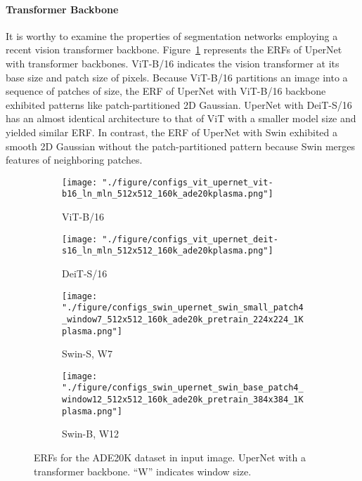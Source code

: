 \documentclass{article}
\def\figref#1{Figure~\ref{#1}}
\begin{document}
\paragraph{Transformer Backbone} It is worthy to examine the properties of segmentation networks employing a recent vision transformer backbone. \figref{fig:trback} represents the ERFs of UperNet \citep{DBLP:conf/eccv/XiaoLZJS18} with transformer backbones. ViT-B/16 indicates the vision transformer at its base size and patch size of  pixels. Because ViT-B/16 \citep{DBLP:conf/iclr/DosovitskiyB0WZ21} partitions an image into a sequence of patches of  size, the ERF of UperNet with ViT-B/16 backbone exhibited patterns like patch-partitioned 2D Gaussian. UperNet with DeiT-S/16 \citep{DBLP:conf/icml/TouvronCDMSJ21} has an almost identical architecture to that of ViT with a smaller model size and yielded similar ERF. In contrast, the ERF of UperNet with Swin \citep{DBLP:conf/iccv/LiuL00W0LG21} exhibited a smooth 2D Gaussian without the patch-partitioned pattern because Swin merges features of neighboring patches.

\begin{figure}[t!]
	\centering
	\begin{subfigure}[b]{0.241\linewidth}
		\centering
		\texttt{[image: "./figure/configs\_vit\_upernet\_vit-b16\_ln\_mln\_512x512\_160k\_ade20kplasma.png"]}
		\caption{ViT-B/16 \citep{DBLP:conf/iclr/DosovitskiyB0WZ21}}
	\end{subfigure}
	\hfill
	\begin{subfigure}[b]{0.241\linewidth}
		\centering
		\texttt{[image: "./figure/configs\_vit\_upernet\_deit-s16\_ln\_mln\_512x512\_160k\_ade20kplasma.png"]}
		\caption{DeiT-S/16 \citep{DBLP:conf/icml/TouvronCDMSJ21}}
	\end{subfigure}
	\hfill
	\begin{subfigure}[b]{0.241\linewidth}
		\centering
		\texttt{[image: "./figure/configs\_swin\_upernet\_swin\_small\_patch4\_window7\_512x512\_160k\_ade20k\_pretrain\_224x224\_1Kplasma.png"]}
		\caption{Swin-S, W7 \citep{DBLP:conf/iccv/LiuL00W0LG21}}
	\end{subfigure}
	\hfill
	\begin{subfigure}[b]{0.241\linewidth}
		\centering
		\texttt{[image: "./figure/configs\_swin\_upernet\_swin\_base\_patch4\_window12\_512x512\_160k\_ade20k\_pretrain\_384x384\_1Kplasma.png"]}
		\caption{Swin-B, W12 \citep{DBLP:conf/iccv/LiuL00W0LG21}}
	\end{subfigure}
	\caption{ERFs for the ADE20K dataset in  input image. UperNet with a transformer backbone. ``W'' indicates window size.}
	\label{fig:trback}
\end{figure}
\end{document}
